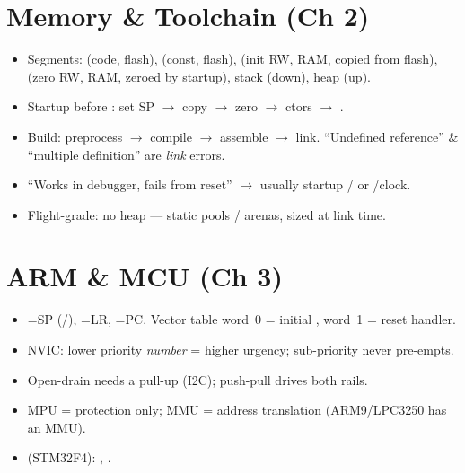 \section*{Memory \& Toolchain (Ch 2)}
\begin{itemize}
\item Segments:  (code, flash),  (const, flash),
   (init RW, RAM, copied from flash),  (zero RW, RAM,
  zeroed by startup), stack (down), heap (up).
\item Startup before : set SP $\rightarrow$ copy 
  $\rightarrow$ zero  $\rightarrow$ ctors $\rightarrow$ .
\item Build: preprocess $\rightarrow$ compile $\rightarrow$ assemble
  $\rightarrow$ link. ``Undefined reference'' \& ``multiple definition'' are
  \emph{link} errors.
\item ``Works in debugger, fails from reset'' $\rightarrow$ usually startup
  / or /clock.
\item Flight-grade: no heap --- static pools / arenas, sized at link time.
\end{itemize}

\section*{ARM \& MCU (Ch 3)}
\begin{itemize}
\item {}=SP (/), =LR, =PC.
  Vector table word~0 = initial , word~1 = reset handler.
\item NVIC: lower priority \emph{number} = higher urgency; sub-priority never
  pre-empts.
\item Open-drain needs a pull-up (I2C); push-pull drives both rails.
\item MPU = protection only; MMU = address translation (ARM9/LPC3250 has an
  MMU).
\item {} (STM32F4): , .
\end{itemize}

